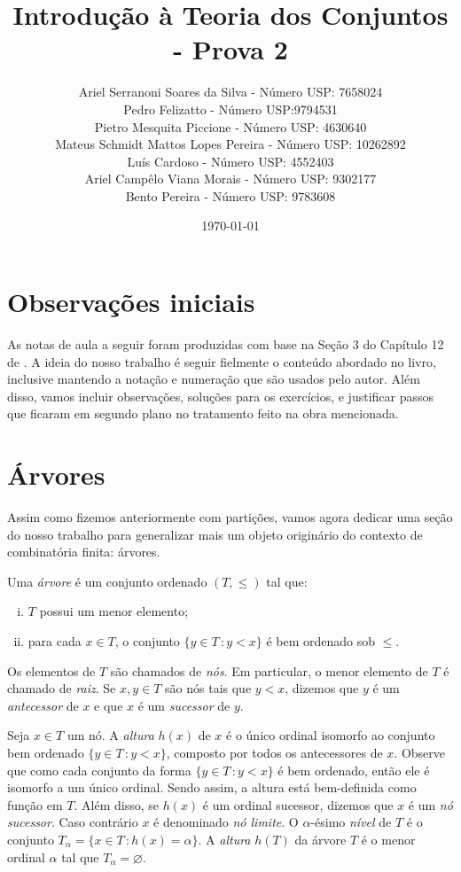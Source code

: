 \documentclass[a4paper]{article}
\title{Introdução à Teoria dos Conjuntos - Prova 2}
\author{Ariel Serranoni Soares da Silva  - Número USP: 7658024\\
Pedro Felizatto - Número USP:9794531\\
Pietro Mesquita Piccione - Número USP: 4630640\\
Mateus Schmidt Mattos Lopes Pereira - Número USP: 10262892\\
Luís Cardoso - Número USP: 4552403\\
Ariel Campêlo Viana Morais - Número USP: 9302177\\
Bento Pereira - Número USP: 9783608}
\date{\today}
\begin{document}
\maketitle

\section*{Observações iniciais}

As notas de aula a seguir foram produzidas com base na Seção 3 do Capítulo 12 de
\cite{jech}. A ideia do nosso trabalho é seguir fielmente o conteúdo abordado no
livro, inclusive mantendo a notação e numeração que são usados pelo autor.
Além disso, vamos incluir observações, soluções para os exercícios, e justificar
passos que ficaram em segundo plano no tratamento feito na obra mencionada.

\setcounter{section}{2}
\section{Árvores}

Assim como fizemos anteriormente com partições, vamos agora dedicar uma seção do
nosso trabalho para generalizar mais um objeto originário do
contexto de combinatória finita: árvores.

\begin{definition}
  Uma \emph{árvore} é um conjunto ordenado \((T,\leq)\) tal que:
 \begin{enumerate}[(i)]
  \item \(T\) possui um menor elemento;
  \item para cada \(x\in T\), o conjunto \(\{y\in T\,\colon y<x\}\) é bem
    ordenado sob \(\leq\).
  \end{enumerate}
\end{definition}
Os elementos de \(T\) são chamados de \emph{nós}. Em particular,
o menor elemento de \(T\) é chamado  de \emph{raiz}.
Se \(x,y\in T\) são nós tais que  \(y<x\), dizemos que \(y\) é um
\emph{antecessor} de \(x\) e que \(x\) é um \emph{sucessor} de \(y\).

Seja \(x\in T\) um nó.  A \emph{altura} \(h(x)\) de \(x\) é o único ordinal
isomorfo ao conjunto bem ordenado \mbox{\(\{y\in T\,\colon
  y<x\}\),} composto por todos os antecessores de \(x\). Observe que como
cada conjunto da forma \(\{y\in T\,\colon y<x\}\) é bem ordenado,
então ele é isomorfo a um único ordinal. Sendo assim, a altura está
bem-definida como função em \(T\).
Além disso, se \(h(x)\) é um ordinal sucessor, dizemos que \(x\) é um
\emph{nó sucessor}. Caso contrário \(x\) é denominado \emph{nó limite}.
O \(\alpha\)-ésimo \emph{nível} de \(T\) é o conjunto
\(T_\alpha=\{x\in T \,\colon h(x)=\alpha\}\). A \emph{altura} \(h(T)\) da árvore
\(T\) é o menor ordinal \(\alpha\) tal que \(T_\alpha=\varnothing\).  
\end{document}
